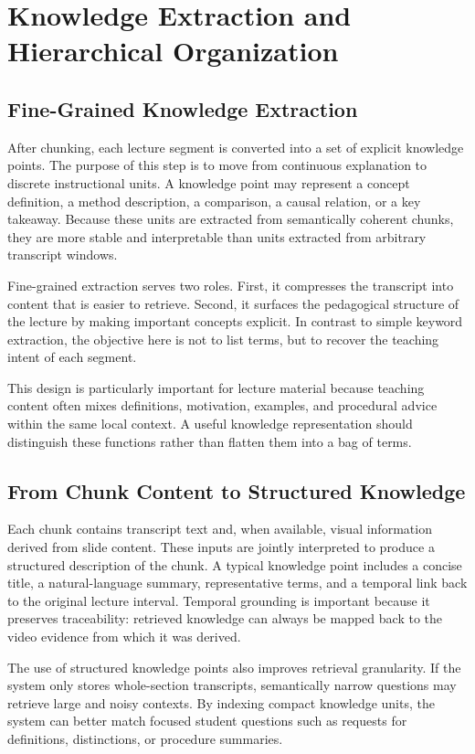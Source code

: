 \section{Knowledge Extraction and Hierarchical Organization}

\subsection{Fine-Grained Knowledge Extraction}

After chunking, each lecture segment is converted into a set of explicit knowledge points. The purpose of this step is to move from continuous explanation to discrete instructional units. A knowledge point may represent a concept definition, a method description, a comparison, a causal relation, or a key takeaway. Because these units are extracted from semantically coherent chunks, they are more stable and interpretable than units extracted from arbitrary transcript windows.

Fine-grained extraction serves two roles. First, it compresses the transcript into content that is easier to retrieve. Second, it surfaces the pedagogical structure of the lecture by making important concepts explicit. In contrast to simple keyword extraction, the objective here is not to list terms, but to recover the teaching intent of each segment.

This design is particularly important for lecture material because teaching content often mixes definitions, motivation, examples, and procedural advice within the same local context. A useful knowledge representation should distinguish these functions rather than flatten them into a bag of terms.

\subsection{From Chunk Content to Structured Knowledge}

Each chunk contains transcript text and, when available, visual information derived from slide content. These inputs are jointly interpreted to produce a structured description of the chunk. A typical knowledge point includes a concise title, a natural-language summary, representative terms, and a temporal link back to the original lecture interval. Temporal grounding is important because it preserves traceability: retrieved knowledge can always be mapped back to the video evidence from which it was derived.

The use of structured knowledge points also improves retrieval granularity. If the system only stores whole-section transcripts, semantically narrow questions may retrieve large and noisy contexts. By indexing compact knowledge units, the system can better match focused student questions such as requests for definitions, distinctions, or procedure summaries.

